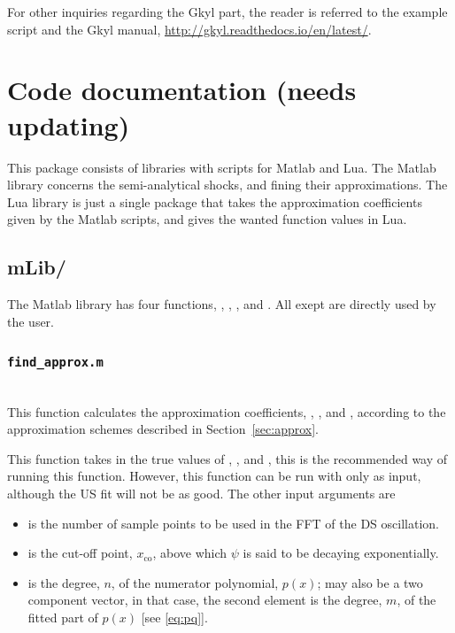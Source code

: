 \documentclass[11pt,a4paper, 
swedish, english %
]{article}
\begin{document}
For other inquiries regarding the Gkyl part, the reader is referred to
the example script and the Gkyl manual,
\url{http://gkyl.readthedocs.io/en/latest/}.


\section{Code documentation (needs updating)}
This package consists of libraries with scripts for Matlab and
Lua. The Matlab library concerns the semi-analytical shocks, and
fining their approximations. The Lua library is just a single package
that takes the approximation coefficients given by the Matlab scripts,
and gives the wanted function values in Lua.

\subsection{mLib/}
The Matlab library has four functions, ,
, , and
. All exept  are directly
used by the user.  

\subsubsection{\texttt{find\_approx.m}}
\label{sec:find_approx}
\\[1ex]
This function calculates the approximation coefficients, ,
, and , according to the approximation schemes
described in Section~\ref{sec:approx}.

This function takes in the true values of , , and
, this is the recommended way of running this
function. However, this function can be run with only  as
input, although the US fit will not be as good. The other input
arguments are
\begin{itemize}
\item {} is the number of sample points to be used in the FFT
of the DS oscillation.
\item {} is the cut-off point, $x_\text{co}$, above which
$\psi$ is said to be decaying exponentially.
\item {} is the degree, $n$, of the numerator polynomial,
$p(x)$;  may also be a two component vector, in that
case, the second element is the degree, $m$, of the fitted part of
$p(x)$ [see \eqref{eq:pq}].
\end{itemize}
\end{document}

